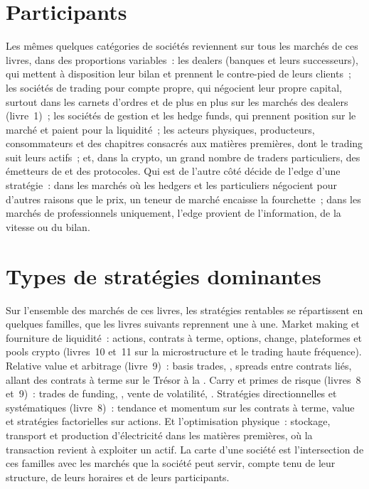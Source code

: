 \section{Participants}

Les mêmes quelques catégories de sociétés reviennent sur tous les marchés de ces livres, dans des proportions variables~: les dealers (banques et leurs successeurs), qui mettent à disposition leur bilan et
prennent le contre-pied de leurs clients~; les sociétés de trading pour compte propre, qui négocient leur propre capital, surtout dans les carnets d'ordres et de plus en plus sur les marchés des dealers
(livre~1)~; les sociétés de gestion et les hedge funds, qui prennent position sur le marché et paient pour la liquidité~; les acteurs physiques, producteurs, consommateurs et  des
chapitres consacrés aux matières premières, dont le trading suit leurs actifs~; et, dans la crypto, un grand nombre de traders particuliers, des émetteurs de  et des protocoles. Qui est
de l'autre côté décide de l'edge d'une stratégie~: dans les marchés où les hedgers et les particuliers négocient pour d'autres raisons que le prix, un teneur de marché encaisse la fourchette~; dans les marchés de
professionnels uniquement, l'edge provient de l'information, de la vitesse ou du bilan.

\section{Types de stratégies dominantes}

Sur l'ensemble des marchés de ces livres, les stratégies rentables se répartissent en quelques familles, que les livres suivants reprennent une à une. Market making et fourniture de
liquidité~: actions, contrats à terme, options, change, plateformes et pools crypto (livres~10 et~11 sur la microstructure et le trading haute fréquence). Relative value et
arbitrage (livre~9)~: basis trades, , spreads entre contrats liés, allant des contrats à terme sur le Trésor à la . Carry et primes de risque (livres~8 et~9)~: trades de
funding, , vente de volatilité, . Stratégies directionnelles et systématiques (livre~8)~: tendance et momentum sur les contrats à terme, value et
stratégies factorielles sur actions. Et l'optimisation physique~: stockage, transport et production d'électricité dans les matières premières, où la transaction revient à exploiter un actif. La carte d'une société est
l'intersection de ces familles avec les marchés que la société peut servir, compte tenu de leur structure, de leurs horaires et de leurs participants.

